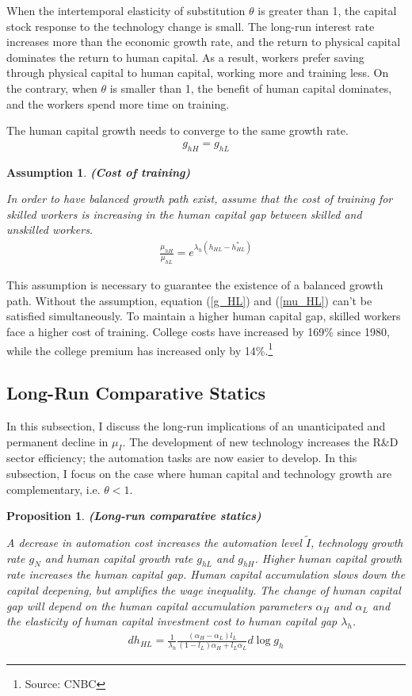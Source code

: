 \documentclass[12pt]{article}
\newtheorem{assumption}{Assumption}
\newtheorem{proposition}{Proposition}
\begin{document}
When the intertemporal elasticity of substitution $\theta$ is greater than 1, the capital stock response to the technology change is small. The long-run interest rate increases more than the economic growth rate, and the return to physical capital dominates the return to human capital. As a result, workers prefer saving through physical capital to human capital, working more and training less. On the contrary, when $\theta$ is smaller than 1, the benefit of human capital dominates, and the workers spend more time on training. 

The human capital growth needs to converge to the same growth rate. 
\begin{align}
\label{g_HL}
g_{hH} = g_{hL}
\end{align}

\begin{assumption}{\bf (Cost of training)}

In order to have balanced growth path exist, assume that the cost of training for skilled workers is increasing in the human capital gap between skilled and unskilled workers. 
\begin{align}
\label{mu_HL}
\frac{\mu_{hH}}{\mu_{hL}} = e^{\lambda_h(h_{HL}-h_{HL}^*)}
\end{align}
\end{assumption}

This assumption is necessary to guarantee the existence of a balanced growth path. Without the assumption, equation (\ref{g_HL}) and (\ref{mu_HL}) can't be satisfied simultaneously. To maintain a higher human capital gap, skilled workers face a higher cost of training. College costs have increased by 169\% since 1980, while the college premium has increased only by 14\%.\footnote{Source: CNBC}


\subsection{Long-Run Comparative Statics}
In this subsection, I discuss the long-run implications of an unanticipated and permanent decline in $\mu_I$. The development of new technology increases the R\&D sector efficiency; the automation tasks are now easier to develop. In this subsection, I focus on the case where human capital and technology growth are complementary, i.e. $\theta<1$. 

\begin{proposition}{\bf (Long-run comparative statics)} 

A decrease in automation cost increases the automation level $\tilde{I}$, technology growth rate $g_N$ and human capital growth rate $g_{hL}$ and $g_{hH}$. Higher human capital growth rate increases the human capital gap. Human capital accumulation slows down the capital deepening, but amplifies the wage inequality. The change of human capital gap will depend on the human capital accumulation parameters $\alpha_H$ and $\alpha_L$ and the elasticity of human capital investment cost to human capital gap $\lambda_h$. 
\begin{align*}
dh_{HL} = \frac{1}{\lambda_h}\frac{(\alpha_H-\alpha_L)l_L}{(1-l_L)\alpha_H+l_L\alpha_L}d\log g_h
\end{align*}
\end{proposition}
\end{document}
